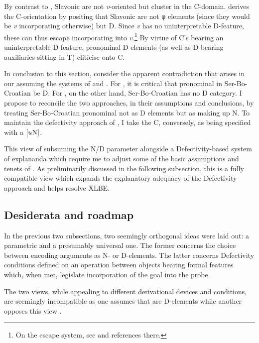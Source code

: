 \documentclass[output=paper]{langsci/langscibook}
\begin{document}
By contrast to , Slavonic  are not \emph{v}-oriented
but cluster in the C-domain. \citet{Roberts2010} derives the C-orientation by
positing that Slavonic  are not φ elements (since
they would be \emph{v} in\-cor\-po\-ra\-ting otherwise) but D.
Since \emph{v} has no uninterpretable D-feature, these 
can thus escape incorporating into \emph{v}.\footnote{On the escape system, see
\citet[391--392]{roberts:2012uq} and references there.} By virtue of C's
bearing an uninterpretable D-feature, pronominal D elements (as
well as D-bearing auxiliaries sitting in T) cliticise onto C.

In conclusion to this section, consider the apparent contradiction that arises
in our assuming the systems of \citet{Roberts2010} and \citet{Boskovic:2005}.
For \cite{Roberts2010}, it is critical that pronominal  in
Ser-Bo-Croatian be D. For \cite{Boskovic:2005},
on the other hand, Ser-Bo-Croatian has no D category. I
propose to reconcile the two approaches, in their assumptions and conclusions,
by treating Ser-Bo-Croatian pronominal  not as
D elements but as making up N. To maintain the defectivity
approach of \citet{Roberts2010}, I take the C, conversely, as being
specified with a $[u\textsc{N}]$.

This view of subsuming the N/D parameter alongside a Defectivity-based system
of explananda which require me to adjust some of the basic assumptions and
tenets of \citet{Roberts2010}. As preliminarily discussed  in the following
subsection, this is a fully compatible view which expands the explanatory
adequacy of the Defectivity approach and helps resolve XLBE.

\subsection{Desiderata and roadmap}
\label{subsec:road}

In the previous two subsections, two seemingly orthogonal ideas were laid out:
a parametric and a presumably universal one. The former concerns the choice
between encoding arguments as N- or D-elements. The latter concerns Defectivity
conditions defined on an  operation between objects bearing formal
features which, when met, legislate incorporation of the goal into the probe.

The two views, while appealing to different derivational devices and
conditions, are seemingly incompatible as one assumes that  are
D-elements \citep{Roberts2010} while another opposes this view
\citep{Boskovic:2009b}.
\end{document}
